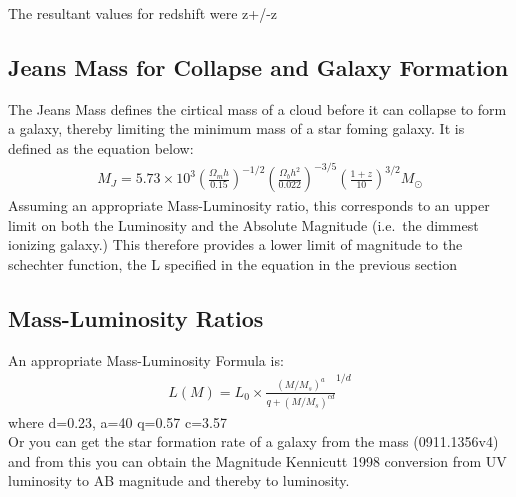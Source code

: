 		The resultant values for redshift were z+/-z

	\subsection{Jeans Mass for Collapse and Galaxy Formation} %
	\label{sub:jeans_mass_for_collapse_and_galaxy_formation}
		The Jeans Mass defines the cirtical mass of a cloud before it can collapse to form a galaxy, thereby limiting the minimum mass of a star foming galaxy. It is defined as the equation below:
		\begin{align}
		M_J = 5.73\times 10^3{\left(\frac{\Omega_mh}{0.15} \right)}^{-1/2} {\left( \frac{\Omega_b h^2}{0.022}\right)}^{-3/5} {\left( \frac {1+z}{10} \right)}^{3/2} M_\odot
		\end{align}
		Assuming an appropriate Mass-Luminosity ratio, this corresponds to an upper limit on both the Luminosity and the Absolute Magnitude (i.e.\ the dimmest ionizing galaxy.) This therefore provides a lower limit of magnitude to the schechter function, the L specified in the equation in the previous section

		\subsection{Mass-Luminosity Ratios}

		An appropriate Mass-Luminosity Formula is:
		\begin{align}
		L(M) = L_0 \times \frac {{(M/M_s)}^a} {q+{(M/M_s)}^{cd}}^{1/d}
		\end{align}
		where d=0.23, a=40 q=0.57 c=3.57\\
		\newline
		Or you can get the star formation rate of a galaxy from the mass (0911.1356v4) and from this you can obtain the Magnitude Kennicutt 1998 conversion from UV luminosity to AB magnitude and thereby to luminosity.

